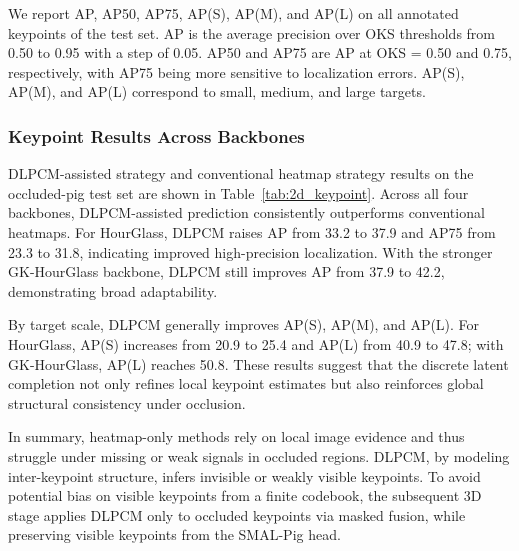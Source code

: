 \documentclass[computers,article,submit,pdftex,moreauthors]{mdpi}
\begin{document}
We report AP, AP50, AP75, AP(S), AP(M), and AP(L) on all annotated keypoints of the test set. AP is the average precision over OKS thresholds from 0.50 to 0.95 with a step of 0.05. AP50 and AP75 are AP at OKS = 0.50 and 0.75, respectively, with AP75 being more sensitive to localization errors. AP(S), AP(M), and AP(L) correspond to small, medium, and large targets.

\subsubsection{Keypoint Results Across Backbones}\label{sec:2d_results}

DLPCM-assisted strategy and conventional heatmap strategy results on the occluded-pig test set are shown in Table~\ref{tab:2d_keypoint}. Across all four backbones, DLPCM-assisted prediction consistently outperforms conventional heatmaps. For HourGlass, DLPCM raises AP from 33.2 to 37.9 and AP75 from 23.3 to 31.8, indicating improved high-precision localization. With the stronger GK-HourGlass backbone, DLPCM still improves AP from 37.9 to 42.2, demonstrating broad adaptability.

By target scale, DLPCM generally improves AP(S), AP(M), and AP(L). For HourGlass, AP(S) increases from 20.9 to 25.4 and AP(L) from 40.9 to 47.8; with GK-HourGlass, AP(L) reaches 50.8. These results suggest that the discrete latent completion not only refines local keypoint estimates but also reinforces global structural consistency under occlusion.

In summary, heatmap-only methods rely on local image evidence and thus struggle under missing or weak signals in occluded regions. DLPCM, by modeling inter-keypoint structure, infers invisible or weakly visible keypoints. To avoid potential bias on visible keypoints from a finite codebook, the subsequent 3D stage applies DLPCM only to occluded keypoints via masked fusion, while preserving visible keypoints from the SMAL-Pig head.
\end{document}

